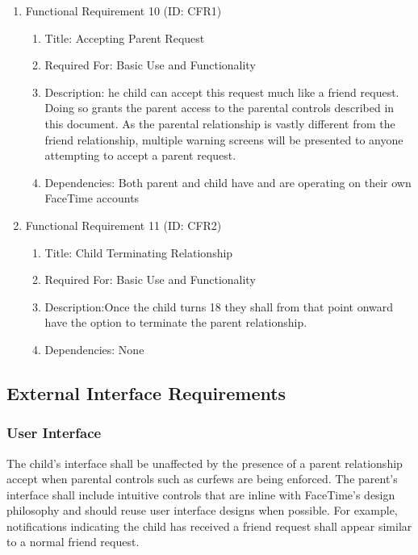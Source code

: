 \documentclass[12pt]{article}
\begin{document}
\begin{enumerate}
    \item Functional Requirement 10 (ID: CFR1)
    \begin{enumerate}
        \item Title: Accepting Parent Request
        \item Required For: Basic Use and Functionality
        \item Description: he child can accept this request much like a friend request. Doing so grants the parent
        access to the parental controls described in this document. As the parental relationship is vastly different
        from the friend relationship, multiple warning screens will be presented to anyone attempting to accept a
        parent request.
        \item Dependencies: Both parent and child have and are operating on their own FaceTime accounts
    \end{enumerate}
    \item Functional Requirement 11 (ID: CFR2)
    \begin{enumerate}
        \item Title: Child Terminating Relationship
        \item Required For: Basic Use and Functionality
        \item Description:Once the child turns 18 they shall from that point onward have the option to terminate
        the parent relationship.
        \item Dependencies: None
    \end{enumerate}
\end{enumerate}

\subsection{External Interface Requirements}

\subsubsection{User Interface}

The child’s interface shall be unaffected by the presence of a parent relationship accept when parental controls
such as curfews are being enforced. The parent’s interface shall include intuitive controls that are inline with
FaceTime’s design philosophy and should reuse user interface designs when possible. For example, notifications
indicating the child has received a friend request shall appear similar to a normal friend request.
\end{document}
